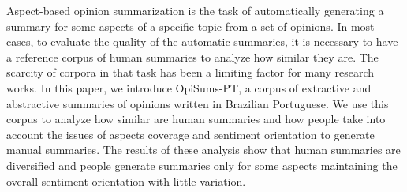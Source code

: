 Aspect-based opinion summarization is the task of automatically generating a summary for some aspects of a specific topic from a set of opinions. In most cases, to evaluate the quality of the automatic summaries, it is necessary to have a reference corpus of human summaries to analyze how similar they are. The scarcity of corpora in that task has been a limiting factor for many research works. In this paper, we introduce OpiSums-PT, a corpus of extractive and abstractive summaries of opinions written in Brazilian Portuguese. We use this corpus to analyze how similar are human summaries and how people take into account the issues of aspects coverage and sentiment orientation to generate manual summaries. The results of these analysis show that human summaries are diversified and people generate summaries only for some aspects maintaining the overall sentiment orientation with little variation.
